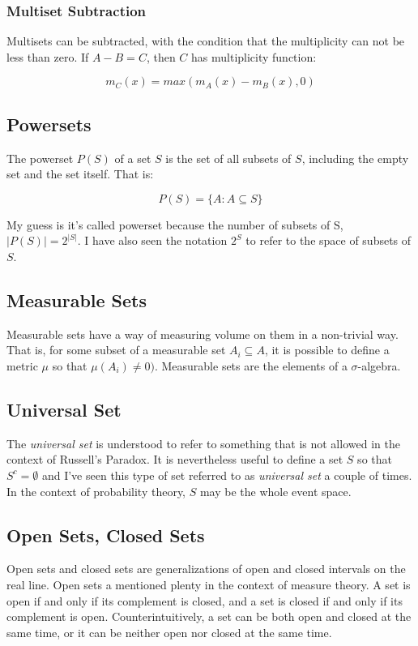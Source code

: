 \subsubsection{Multiset Subtraction}
Multisets can be subtracted, with the condition that the multiplicity can not be less than zero. If $A- B = C$, then $C$ has multiplicity function:

\begin{equation}
m_C(x) = max\left(m_A(x) - m_B(x), 0\right)
\end{equation}

\subsection{Powersets}
The powerset $P(S)$ of a set $S$ is the set of all subsets of $S$, including the empty set and the set itself. That is:

\begin{equation}
P(S) = \{ A : A\subseteq S\}
\end{equation}

My guess is it's called powerset because the number of subsets of S, $|P(S)| = 2^{|S|}$. I have also seen the notation $2^S$ to refer to the space of subsets of $S$.



\subsection{Measurable Sets}
Measurable sets have a way of measuring volume on them in a non-trivial way. That is, for some subset of a measurable set $A_i \subseteq A$, it is possible to define a metric $\mu$ so that $\mu(A_i) \neq0)$. Measurable sets are the elements of a $\sigma$-algebra. 

\subsection{Universal Set}
The \textit{universal set} is understood to refer to something that is not allowed in the context of Russell's Paradox. It is nevertheless useful to define a set $S$ so that $S^c = \emptyset$ and I've seen this type of set referred to as \textit{universal set} a couple of times. In the context of probability theory, $S$ may be the whole event space.




\subsection{Open Sets, Closed Sets}
Open sets and closed sets are generalizations of open and closed intervals on the real line. Open sets a mentioned plenty in the context of measure theory. A set is open if and only if its complement is closed, and a set is closed if and only if its complement is open. Counterintuitively, a set can be both open and closed at the same time, or it can be neither open nor closed at the same time.


